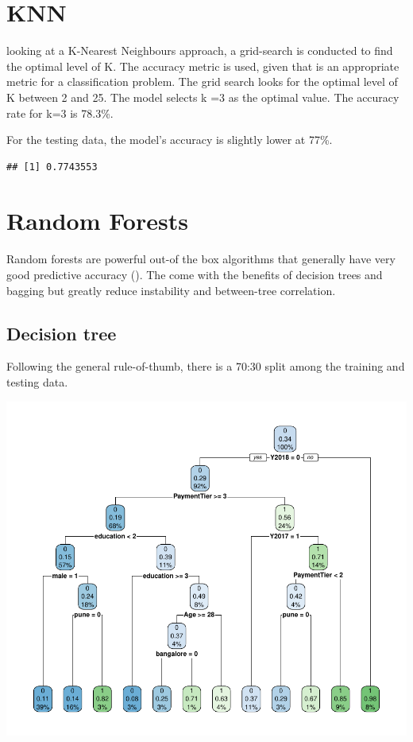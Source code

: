 \documentclass[11pt,preprint, authoryear]{elsarticle}
\numberwithin{equation}{section}
\numberwithin{figure}{section}
\numberwithin{table}{section}
\begin{document}
\hypertarget{knn}{%
\section*{KNN}\label{knn}}

looking at a K-Nearest Neighbours approach, a grid-search is conducted
to find the optimal level of K. The accuracy metric is used, given that
is an appropriate metric for a classification problem. The grid search
looks for the optimal level of K between 2 and 25. The model selects k
=3 as the optimal value. The accuracy rate for k=3 is 78.3\%.

For the testing data, the model's accuracy is slightly lower at 77\%.

\begin{verbatim}
## [1] 0.7743553
\end{verbatim}

\hypertarget{random-forests}{%
\section*{Random Forests}\label{random-forests}}

Random forests are powerful out-of the box algorithms that generally
have very good predictive accuracy (). The come with the benefits of
decision trees and bagging but greatly reduce instability and
between-tree correlation.

\hypertarget{decision-tree}{%
\subsection*{Decision tree}\label{decision-tree}}

Following the general rule-of-thumb, there is a 70:30 split among the
training and testing data.

\includegraphics{Final_project_files/figure-latex/unnamed-chunk-8-1.pdf}
\end{document}
